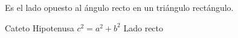 
\question Es el lado opuesto al ángulo recto en un triángulo rectángulo.

  \begin{oneparchoices}
    \choice Cateto
    \CorrectChoice Hipotenusa
    \choice $c^2 = a^2 + b^2$
    \choice Lado recto
  \end{oneparchoices}
  \answerline[B]
